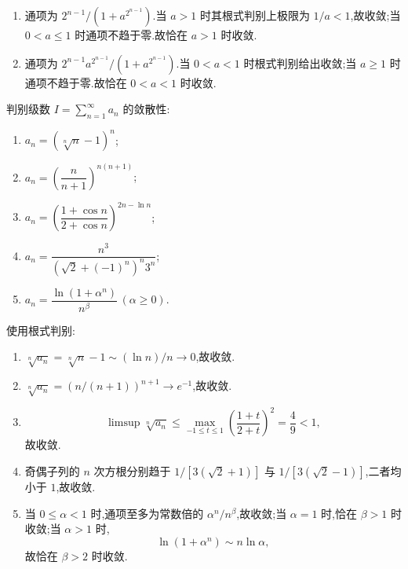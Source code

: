 \begin{solution}
    \leavevmode
    \begin{enumerate}
        \item 通项为 $2^{n-1}/(1+a^{2^{n-1}})$.当 $a>1$ 时其根式判别上极限为 $1/a<1$,故收敛;当 $0<a\leq1$ 时通项不趋于零.故恰在 $a>1$ 时收敛.
        \item 通项为 $2^{n-1}a^{2^{n-1}}/(1+a^{2^{n-1}})$.当 $0<a<1$ 时根式判别给出收敛;当 $a\geq1$ 时通项不趋于零.故恰在 $0<a<1$ 时收敛.
    \end{enumerate}
\end{solution}




\begin{example}
    判别级数 $\displaystyle I=\sum\limits_{n=1}^{\infty}a_n$ 的敛散性:
    \begin{enumerate}
        \item $\displaystyle a_n=(\sqrt[n]{n}-1)^n$;
        \item $\displaystyle a_n=\left(\dfrac{n}{n+1}\right)^{n(n+1)}$;
        \item $\displaystyle a_n=\left(\dfrac{1+\cos n}{2+\cos n}\right)^{2n-\ln n}$;
        \item $\displaystyle a_n=\dfrac{n^3}{(\sqrt2+(-1)^n)^n3^n}$;
        \item $\displaystyle a_n=\dfrac{\ln(1+\alpha^n)}{n^\beta}\,(\alpha\geq0)$.
    \end{enumerate}
\end{example}
\exampleblank

\begin{solution}
    使用根式判别:
    \begin{enumerate}
        \item $\sqrt[n]{a_n}=\sqrt[n]n-1\sim(\ln n)/n\to0$,故收敛.
        \item $\sqrt[n]{a_n}=(n/(n+1))^{n+1}\to e^{-1}$,故收敛.
        \item
              \[
                  \displaystyle\limsup\sqrt[n]{a_n}
                  \leq\max_{-1\leq t\leq1}\left(\dfrac{1+t}{2+t}\right)^2
                  =\dfrac{4}{9}<1,
              \]
              故收敛.
        \item 奇偶子列的 $n$ 次方根分别趋于
              $1/[3(\sqrt2+1)]$ 与 $1/[3(\sqrt2-1)]$,二者均小于 $1$,故收敛.
        \item 当 $0\leq\alpha<1$ 时,通项至多为常数倍的
              $\alpha^n/n^\beta$,故收敛;当 $\alpha=1$ 时,恰在 $\beta>1$ 时收敛;当 $\alpha>1$ 时,
              \[
                  \ln(1+\alpha^n)\sim n\ln\alpha,
              \]
              故恰在 $\beta>2$ 时收敛.
    \end{enumerate}
\end{solution}

